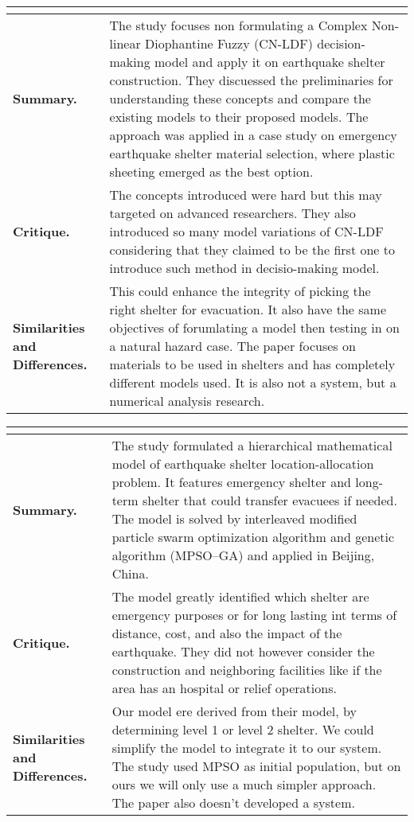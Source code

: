\begin{longtable}{|L{.2\linewidth}|L{.74\linewidth}|}
	\hline
	\\ \hline
	\textbf{Summary.} & The study focuses non formulating a Complex Non-linear Diophantine Fuzzy (CN-LDF) decision-making model  and apply it on earthquake shelter construction. They discuessed the preliminaries for understanding these concepts and compare the existing models to their proposed models. The approach was applied in a case study on emergency earthquake shelter material selection, where plastic sheeting emerged as the best option.\\ \hline
	\textbf{Critique.} & The concepts introduced were hard but this may targeted on advanced researchers. They also introduced so many model variations of CN-LDF considering that they claimed to be the first one to introduce such method in decisio-making model.\\ \hline
	\textbf{Similarities and Differences.} & This could enhance the integrity of picking the right shelter for evacuation. It also have the same objectives of forumlating a model then testing in on a natural hazard case. The paper focuses on materials to be used in shelters and has completely different models used. It is also not a system, but a numerical analysis research.\\ \hline
\end{longtable}

\begin{longtable}{|L{.2\linewidth}|L{.74\linewidth}|}
	\hline
	\\ \hline
	\textbf{Summary.} & The study formulated a hierarchical mathematical model of  earthquake shelter location-allocation problem. It features emergency shelter and long-term shelter that could transfer evacuees if needed. The model is solved by interleaved modified particle swarm optimization algorithm and genetic algorithm (MPSO–GA) and applied in Beijing, China.\\ \hline
	\textbf{Critique.} & The model greatly identified which shelter are emergency purposes or for long lasting int terms of distance, cost, and also the impact of the earthquake. They did not however consider the construction and neighboring facilities like if the area has an hospital or relief operations.\\ \hline
	\textbf{Similarities and Differences.} & Our model ere derived from their model, by determining level 1 or level 2 shelter.  We could simplify the model to integrate it to our system.	The study used MPSO as initial population, but on ours we will only use a much simpler approach. The paper also doesn't developed a system.\\ \hline
\end{longtable}

